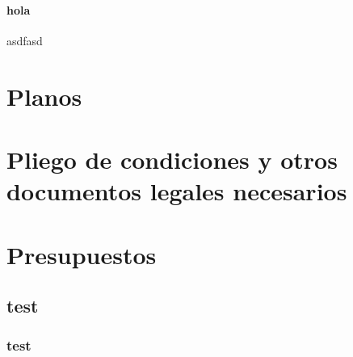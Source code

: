 \documentclass[a4paper ,12pt, onecolumn]{article}
\begin{document}
\paragraph{hola}
asdfasd

\section{Planos}
\section{Pliego de condiciones y otros documentos legales necesarios}
\section{Presupuestos}
\subsection{test}
\subsubsection{test}
\end{document}
